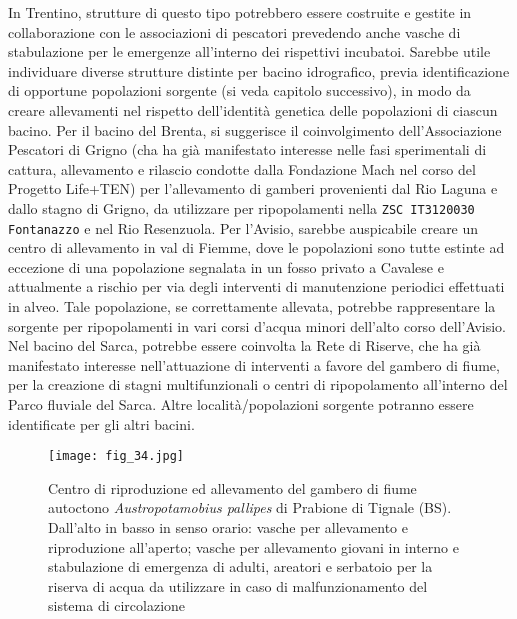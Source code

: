 \documentclass[11pt,a4paper,italian,twoside,openany]{memoir}
\begin{document}
In Trentino, strutture di questo tipo potrebbero essere costruite e gestite in collaborazione con le associazioni di pescatori prevedendo anche vasche di stabulazione per le emergenze all'interno dei rispettivi incubatoi. Sarebbe utile individuare diverse strutture distinte per bacino idrografico, previa identificazione di opportune popolazioni sorgente (si veda capitolo successivo), in modo da creare allevamenti nel rispetto dell'identità genetica delle popolazioni di ciascun bacino. Per il bacino del Brenta, si suggerisce il coinvolgimento dell'Associazione Pescatori di Grigno (cha ha già manifestato interesse nelle fasi sperimentali di cattura, allevamento e rilascio condotte dalla Fondazione Mach nel corso del Progetto Life+TEN) per l'allevamento di gamberi provenienti dal Rio Laguna e dallo stagno di Grigno, da utilizzare per ripopolamenti nella \texttt{ZSC IT3120030 Fontanazzo} e nel Rio Resenzuola. Per l'Avisio, sarebbe auspicabile creare un centro di allevamento in val di Fiemme, dove le popolazioni sono tutte estinte ad eccezione di una popolazione segnalata in un fosso privato a Cavalese e attualmente a rischio per via degli interventi di manutenzione periodici effettuati in alveo. Tale popolazione, se correttamente allevata, potrebbe rappresentare la sorgente per ripopolamenti in vari corsi d'acqua minori dell'alto corso dell'Avisio. Nel bacino del Sarca, potrebbe essere coinvolta la Rete di Riserve, che ha già manifestato interesse nell'attuazione di interventi a favore del gambero di fiume, per la creazione di stagni multifunzionali o centri di ripopolamento all'interno del Parco fluviale del Sarca. Altre località/popolazioni sorgente potranno essere identificate per gli altri bacini. 


\begin{figure}
  \centering
  \texttt{[image: fig\_34.jpg]}
  \caption{Centro di riproduzione ed allevamento del gambero di fiume autoctono \emph{Austropotamobius pallipes} di Prabione di Tignale (BS). Dall'alto in basso in senso orario: vasche per allevamento e riproduzione all'aperto; vasche per allevamento giovani in interno e stabulazione di emergenza di adulti, areatori e serbatoio per la riserva di acqua da utilizzare in caso di malfunzionamento del sistema di circolazione}
  \label{fig_34}
\end{figure}
\end{document}
